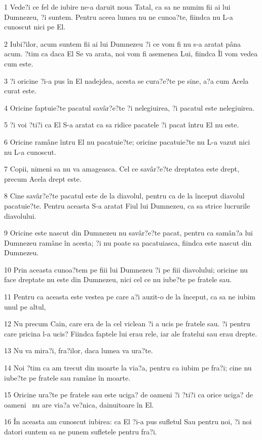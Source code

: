 \par 1 Vede?i ce fel de iubire ne-a daruit noua Tatal, ca sa ne numim fii ai lui Dumnezeu, ?i suntem. Pentru aceea lumea nu ne cunoa?te, fiindca nu L-a cunoscut nici pe El.
\par 2 Iubi?ilor, acum suntem fii ai lui Dumnezeu ?i ce vom fi nu s-a aratat pâna acum. ?tim ca daca El Se va arata, noi vom fi asemenea Lui, fiindca Îl vom vedea cum este.
\par 3 ?i oricine ?i-a pus în El nadejdea, acesta se cura?e?te pe sine, a?a cum Acela curat este.
\par 4 Oricine faptuie?te pacatul savâr?e?te ?i nelegiuirea, ?i pacatul este nelegiuirea.
\par 5 ?i voi ?ti?i ca El S-a aratat ca sa ridice pacatele ?i pacat întru El nu este.
\par 6 Oricine ramâne întru El nu pacatuie?te; oricine pacatuie?te nu L-a vazut nici nu L-a cunoscut.
\par 7 Copii, nimeni sa nu va amageasca. Cel ce savâr?e?te dreptatea este drept, precum Acela drept este.
\par 8 Cine savâr?e?te pacatul este de la diavolul, pentru ca de la început diavolul pacatuie?te. Pentru aceasta S-a aratat Fiul lui Dumnezeu, ca sa strice lucrurile diavolului.
\par 9 Oricine este nascut din Dumnezeu nu savâr?e?te pacat, pentru ca samân?a lui Dumnezeu ramâne în acesta; ?i nu poate sa pacatuiasca, fiindca este nascut din Dumnezeu.
\par 10 Prin aceasta cunoa?tem pe fiii lui Dumnezeu ?i pe fiii diavolului; oricine nu face dreptate nu este din Dumnezeu, nici cel ce nu iube?te pe fratele sau.
\par 11 Pentru ca aceasta este vestea pe care a?i auzit-o de la început, ca sa ne iubim unul pe altul,
\par 12 Nu precum Cain, care era de la cel viclean ?i a ucis pe fratele sau. ?i pentru care pricina l-a ucis? Fiindca faptele lui erau rele, iar ale fratelui sau erau drepte.
\par 13 Nu va mira?i, fra?ilor, daca lumea va ura?te.
\par 14 Noi ?tim ca am trecut din moarte la via?a, pentru ca iubim pe fra?i; cine nu iube?te pe fratele sau ramâne în moarte.
\par 15 Oricine ura?te pe fratele sau este uciga? de oameni ?i ?ti?i ca orice uciga? de oameni  nu are via?a ve?nica, dainuitoare în El.
\par 16 În aceasta am cunoscut iubirea: ca El ?i-a pus sufletul Sau pentru noi, ?i noi datori suntem sa ne punem sufletele pentru fra?i.

